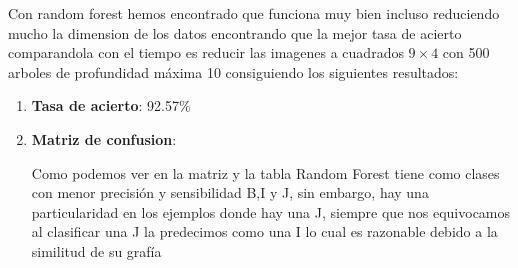 \documentclass[8pt,a4paper]{article}
\begin{document}
Con random forest hemos encontrado que funciona muy bien incluso reduciendo mucho la dimension de los datos encontrando que la mejor tasa de acierto comparandola con el tiempo es reducir las imagenes a cuadrados $9\times4$ con 500 arboles de profundidad máxima 10 consiguiendo los siguientes resultados:
\begin{enumerate}
\item \textbf{Tasa de acierto}: 92.57$\%$
\item \textbf{Matriz de confusion}:

Como podemos ver en la matriz y la tabla Random Forest tiene como clases con menor precisión y sensibilidad B,I y J, sin embargo, hay una particularidad en los ejemplos donde hay una J, siempre que nos equivocamos al clasificar una J la predecimos como una I lo cual es razonable debido a la similitud de su grafía


\end{enumerate}
\end{document}
